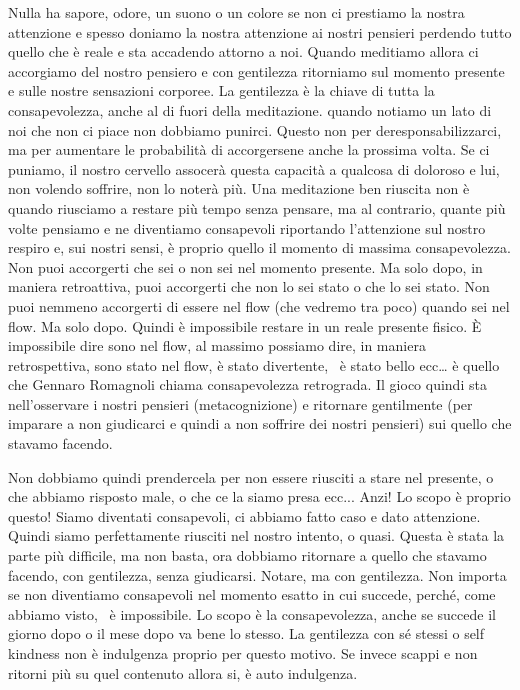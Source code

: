 \documentclass[12pt]{book} %
\begin{document}
Nulla ha sapore, odore, un suono o un colore se non ci prestiamo la nostra attenzione e spesso doniamo la nostra
attenzione ai nostri pensieri perdendo tutto quello che è reale e sta accadendo attorno a noi. Quando meditiamo allora
ci accorgiamo del nostro pensiero e con gentilezza ritorniamo sul momento presente e sulle nostre sensazioni corporee.
La gentilezza è la chiave di tutta la consapevolezza, anche al di fuori della meditazione. quando notiamo un lato di
noi che non ci piace non dobbiamo punirci. Questo non per deresponsabilizzarci, ma per aumentare le probabilità di
accorgersene anche la prossima volta. Se ci puniamo, il nostro cervello assocerà questa capacità a qualcosa di doloroso
e lui, non volendo soffrire, non lo noterà più. Una meditazione ben riuscita non è quando riusciamo a restare più tempo
senza pensare, ma al contrario, quante più volte pensiamo e ne diventiamo consapevoli riportando
l'attenzione sul nostro respiro e, sui nostri sensi, è proprio quello il momento di massima
consapevolezza. Non puoi accorgerti che sei o non sei nel momento presente. Ma solo dopo, in maniera retroattiva, puoi
accorgerti che non lo sei stato o che lo sei stato. Non puoi nemmeno accorgerti di essere nel flow (che vedremo tra
poco) quando sei nel flow. Ma solo dopo. Quindi è impossibile restare in un reale presente fisico. È impossibile dire
sono nel flow, al massimo possiamo dire, in maniera retrospettiva, sono stato nel flow, è stato divertente, \ è stato
bello ecc… è quello che Gennaro Romagnoli chiama consapevolezza retrograda. Il gioco quindi sta
nell'osservare i nostri pensieri (metacognizione) e ritornare gentilmente (per imparare a non
giudicarci e quindi a non soffrire dei nostri pensieri) sui quello che stavamo facendo.

Non dobbiamo quindi prendercela per non essere riusciti a stare nel presente, o che abbiamo risposto male, o che ce la
siamo presa ecc... Anzi! Lo scopo è proprio questo! Siamo diventati consapevoli, ci abbiamo fatto caso e dato
attenzione. Quindi siamo perfettamente riusciti nel nostro intento, o quasi. Questa è stata la parte più difficile, ma
non basta, ora dobbiamo ritornare a quello che stavamo facendo, con gentilezza, senza giudicarsi. Notare, ma con
gentilezza. Non importa se non diventiamo consapevoli nel momento esatto in cui succede, perché, come abbiamo visto,
\ è impossibile. Lo scopo è la consapevolezza, anche se succede il giorno dopo o il mese dopo va bene lo stesso. La
gentilezza con sé stessi o self kindness non è indulgenza proprio per questo motivo. Se invece scappi e non ritorni più
su quel contenuto allora si, è auto indulgenza.
\end{document}
